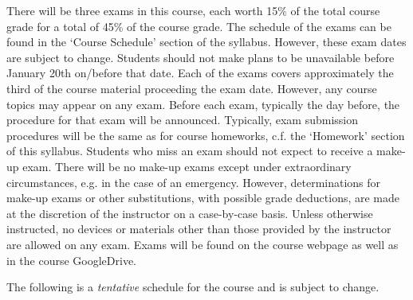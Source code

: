 \documentclass[11pt,letterpaper]{article}
\begin{document}
There will be three exams in this course, each worth 15\% of the total course grade for a total of 45\% of the course grade. The schedule of the exams can be found in the `Course Schedule' section of the syllabus. However, these exam dates are subject to change. Students should not make plans to be unavailable before January 20th on/before that date. Each of the exams covers approximately the third of the course material proceeding the exam date. However, any course topics may appear on any exam. Before each exam, typically the day before, the procedure for that exam will be announced. Typically, exam submission procedures will be the same as for course homeworks, c.f. the `Homework' section of this syllabus. Students who miss an exam should not expect to receive a make-up exam. There will be no make-up exams except under extraordinary circumstances, e.g. in the case of an emergency. However, determinations for make-up exams or other substitutions, with possible grade deductions, are made at the discretion of the instructor on a case-by-case basis. Unless otherwise instructed, no devices or materials other than those provided by the instructor are allowed on any exam. Exams will be found on the course webpage as well as in the course GoogleDrive. \pspace


The following is a \emph{tentative} schedule for the course and is subject to change. 
        \begin{table}[!ht]
        \centering
        \end{table}
\end{document}
